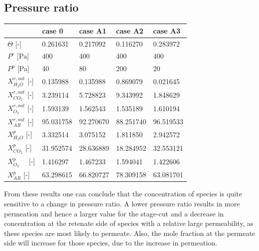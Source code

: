 \subsection{Pressure ratio}
\begin{table}[H]
\centering
\begin{tabular}{|l|l|l|l|l|}
\hline
                    & case 0    & case A1   & case A2 & case A3 \\ \hline
$\Theta$ \hspace{0.35cm}  [-]          & 0.261631  & 0.217092   & 0.116270 & 0.283972 \\ \hline
$P^r$   \hspace{0.35cm}  [Pa]          & 400       & 400       & 400     & 400     \\ \hline
$P^p$   \hspace{0.35cm}   [Pa]          & 40        & 80        & 200     & 20      \\ \hline \hline
$X^{r,out}_{H_2O}$ [-]  & 0.135988  & 0.135988  & 0.869079   & 0.021645        \\ \hline
$X^{r,out}_{CO_2}$ [-]  & 3.239114  & 5.728823  & 9.343992   & 1.848629        \\ \hline
$X^{r,out}_{O_2}$  [-]  & 1.593139  & 1.562543  & 1.535189   & 1.610194        \\ \hline
$X^{r,out}_{AR}$   [-]  & 95.031758 & 92.270670 & 88.251740  & 96.519533        \\ \hline
$X^{p}_{H_2O}$ \hspace{0.03cm}[-]  & 3.332514  & 3.075152  &  1.811850  &  2.942572       \\ \hline
$X^{p}_{CO_2}$ \hspace{0.03cm}[-]  & 31.952574 & 28.636889 & 18.284952  & 32.553121        \\ \hline
$X^{p}_{O_2}$  \ \ [-]  & 1.416297  & 1.467233  & 1.594041   &  1.422606       \\ \hline
$X^{p}_{AR}$  \hspace{0.06cm}   [-]  & 63.298615 & 66.820727 & 78.309158  &  63.081701       \\ \hline
\end{tabular}
\end{table}
From these results one can conclude that the concentration of species is quite sensitive to a change in pressure ratio. A lower pressure ratio results in more permeation and hence a larger value for the stage-cut and a decrease in concentration at the retenate side of species with a relative large permeability, as these species are most likely to permeate. Also, the mole fraction at the permeate side will increase for those species, due to the increase in permeation.\\
